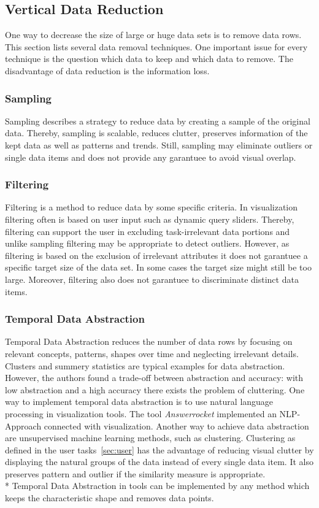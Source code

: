 \subsection{Vertical Data Reduction}
One way to decrease the size of large or huge data sets is to remove data rows. This section lists several data removal techniques.  One important issue for every technique is the question which data to keep and which data to remove. The disadvantage of data reduction is the information loss.
\subsubsection*{Sampling}
Sampling describes a strategy to reduce data by creating a sample of the original data. Thereby, sampling is scalable, reduces clutter, preserves information of the kept data as well as patterns and trends\cite{PiringerHarald2011}. Still, sampling may eliminate outliers or single data items and does not provide any garantuee to avoid visual overlap. 
\subsubsection*{Filtering}
Filtering is a method to reduce data by some specific criteria. In visualization filtering often is based on user input such as dynamic query sliders. Thereby, filtering can support the user in excluding task-irrelevant data portions and unlike sampling filtering may be appropriate to detect outliers. However, as filtering is based on the exclusion of irrelevant attributes it does not garantuee a specific target size of the data set. In some cases the target size might still be too large. Moreover, filtering also does not garantuee to discriminate distinct data items\cite{PiringerHarald2011}.
\subsubsection*{Temporal Data Abstraction}
Temporal Data Abstraction\cite{Aigner2011} reduces the number of data rows by focusing on relevant concepts, patterns, shapes over time and neglecting irrelevant details. Clusters and summery statistics\cite{PiringerHarald2011} are typical examples for data abstraction. However, the authors found a trade-off between abstraction and accuracy: with low abstraction and a high accuracy there exists the problem of cluttering. 
One way to implement temporal data abstraction is to use natural language processing in visualization tools. The tool \textit{Answerrocket} implemented an NLP-Approach connected with visualization. Another way to achieve data abstraction are unsupervised machine learning methods, such as clustering.
Clustering as defined in the user tasks~\ref{sec:user} has the advantage of reducing visual clutter by displaying the natural groups of the data instead of every single data item. It also preserves pattern and outlier if the similarity measure is appropriate.\\*
Temporal Data Abstraction in tools can be implemented by any method which keeps the characteristic shape and removes data points. 
